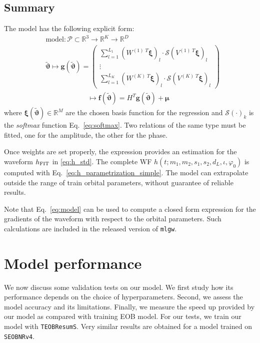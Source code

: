 \documentclass[twocolumn,showpacs,preprintnumbers,nofootinbib,prd,
superscriptaddress,10pt]{revtex4-1}
\newcommand{\R}{\mathbb{R}}
\begin{document}
\subsection{Summary}
The model has the following explicit form:
\begin{align}
	& \textrm{model}: \mathcal{P} \subset \R^3 \rightarrow \R^K \rightarrow \R^D \nonumber\\
	& {\tilde{\boldsymbol{\vartheta}}}
	\longmapsto  \mathbf{g}({\tilde{\boldsymbol{\vartheta}}} ) = 
		\begin{pmatrix}
		\sum_{l=1}^{L_1} (W^{(1)\;T} \boldsymbol{\xi})_l \cdot \mathcal{S}(V^{(1)\;T}\boldsymbol{\xi})_l \\
		\vdots \\
		\sum_{l=1}^{L_K}  (W^{(K)\;T} \boldsymbol{\xi})_l \cdot \mathcal{S}(V^{(K)\;T}\boldsymbol{\xi})_l
		\end{pmatrix}
	\nonumber \\	
	& \qquad \qquad \qquad \longmapsto \mathbf{f}({\tilde{\boldsymbol{\vartheta}}} ) = H^T \mathbf{g}({\tilde{\boldsymbol{\vartheta}}} ) + \boldsymbol{\mu} \label{eq:model}
\end{align}
where ${\boldsymbol{\xi}}({\tilde{\boldsymbol{\vartheta}}}) \in \R^M $ are the chosen basis function for the regression and $\mathcal{S}(\cdot)_k$ is the \textit{softmax} function Eq.~\eqref{eq:softmax}.
Two relations of the same type must be fitted, one for the amplitude, the other for the phase.

Once weights are set properly, the expression provides an estimation for the waveform $h_{\rm FIT}$ in \eqref{eq:h_std}.
The complete WF $h(t;m_1,m_2, s_1, s_2, d_L, \iota, \varphi_0)$ is computed with Eq.~\eqref{eq:h_parametrization_simple}.
The model can extrapolate outside the range of train orbital parameters, without guarantee of reliable results.

Note that Eq.~\eqref{eq:model} can be used to compute a closed form expression for the gradients 
of the waveform with respect to the orbital parameters. Such calculations are included 
in the released version of \texttt{mlgw}.

\section{Model performance}
\label{sec:performance}
We now discuss some validation tests on our model. We first study how its performance depends on the choice of hyperparameters. Second, we assess the model accuracy and its limitations.
Finally, we measure the speed up provided by our model as compared with training EOB model.
For our tests, we train our model with \texttt{TEOBResumS}. Very similar results are obtained for a model trained on \texttt{SEOBNRv4}.
\end{document}
